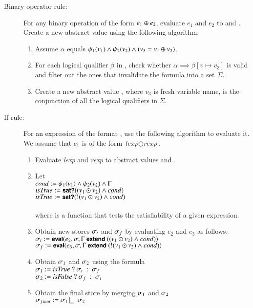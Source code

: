 \begin{description}
\item[Binary operator rule:]
For any binary operation of the form \ensuremath{e_1 \bop e_2}, evaluate $e_1$ and $e_2$ to  and . Create a new abstract value  using the following algorithm.
\begin{enumerate}
\item
Assume $\alpha$ equals $\psi_{1}(v_{1}) \land \psi_{2}(v_{2}) \land (v_3 = v_1 \oplus v_2)$.
\item
For each logical qualifier \ensuremath{\beta} in \marketplace, check whether \ensuremath{\alpha \implies \beta[v\mapsto v_3]} is valid and filter out the ones that invalidate the formula into a set $\Sigma$.
\item
Create a new abstract value , where $v_3$ is fresh variable name,  is the conjunction of all the logical qualifiers in $\Sigma$.
\end{enumerate}


\item[If rule:] 
For an  expression of the format \cond , use the following algorithm to evaluate it. We assume that $e_1$ is of the form $\textit{lexp} \odot \textit{rexp}$.
\begin{enumerate}
\item
Evaluate \textit{lexp} and \textit{rexp} to abstract values  and .
\item
Let\\ 
$\textit{cond} := \psi_{1}(v_{1}) \land \psi_{2}(v_{2}) \land \Gamma$ \\
$\textit{isTrue} := \mbox{\sffamily{\bfseries\small {sat?}}}((v_1 \odot v_2) \land cond)$ \\
$\textit{isTrue} := \mbox{\sffamily{\bfseries\small {sat?}}}(!(v_1 \odot v_2) \land cond)$ \\
\\
where  is a function that tests the satisfiability of a given expression.
\item
Obtain new stores $\sigma_t$ and $\sigma_f$ by evaluating $e_2$ and $e_3$ as follows.\\
$\store_t := \kw{eval}(e_2, \store, \EA\ \kw{extend}\ ((v_1 \odot v_2) \logand cond))$\\
$\store_f := \kw{eval}(e_3, \store, \EA\ \kw{extend}\ (!(v_1 \odot v_2) \logand cond))$
\item
Obtain $\sigma_1$ and $\sigma_2$ using the formula \\
$\store_1 := \textit{isTrue}\ ?\ \store_t\ :\ \store_f$\\
$\store_2 := \textit{isFalse}\ ?\ \store_f\ :\ \store_t$
\item
Obtain the final store by merging $\sigma_1$ and $\sigma_2$\\
$\store_{final} := \store_1 \bigsqcup\ \store_2 $
\end{enumerate}



\end{description}
